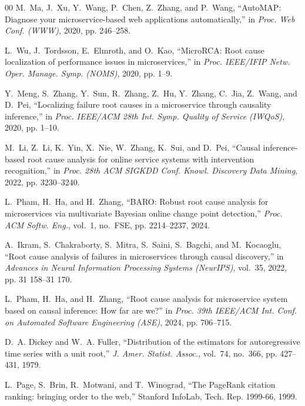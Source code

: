 \documentclass[conference]{IEEEtran}
\begin{document}
\begin{thebibliography}{00}
M.~Ma, J.~Xu, Y.~Wang, P.~Chen, Z.~Zhang, and P.~Wang, ``AutoMAP: Diagnose
your microservice-based web applications automatically,'' in \emph{Proc. Web
Conf. (WWW)}, 2020, pp. 246--258.

L.~Wu, J.~Tordsson, E.~Elmroth, and O.~Kao, ``MicroRCA: Root cause
localization of performance issues in microservices,'' in \emph{Proc.
IEEE/IFIP Netw. Oper. Manage. Symp. (NOMS)}, 2020, pp. 1--9.

Y.~Meng, S.~Zhang, Y.~Sun, R.~Zhang, Z.~Hu, Y.~Zhang, C.~Jia, Z.~Wang, and
D.~Pei, ``Localizing failure root causes in a microservice through causality
inference,'' in \emph{Proc. IEEE/ACM 28th Int. Symp. Quality of Service
(IWQoS)}, 2020, pp. 1--10.

M.~Li, Z.~Li, K.~Yin, X.~Nie, W.~Zhang, K.~Sui, and D.~Pei, ``Causal
inference-based root cause analysis for online service systems with
intervention recognition,'' in \emph{Proc. 28th ACM SIGKDD Conf. Knowl.
Discovery Data Mining}, 2022, pp. 3230--3240.

L.~Pham, H.~Ha, and H.~Zhang, ``BARO: Robust root cause analysis for
microservices via multivariate Bayesian online change point detection,''
\emph{Proc. ACM Softw. Eng.}, vol.~1, no.~FSE, pp. 2214--2237, 2024.

A.~Ikram, S.~Chakraborty, S.~Mitra, S.~Saini, S.~Bagchi, and M.~Kocaoglu,
``Root cause analysis of failures in microservices through causal
discovery,'' in \emph{Advances in Neural Information Processing Systems
(NeurIPS)}, vol.~35, 2022, pp. 31 158--31 170.

L.~Pham, H.~Ha, and H.~Zhang, ``Root cause analysis for microservice system
based on causal inference: How far are we?'' in \emph{Proc. 39th IEEE/ACM
Int. Conf. on Automated Software Engineering (ASE)}, 2024, pp. 706--715.

D.~A. Dickey and W.~A. Fuller, ``Distribution of the estimators for
autoregressive time series with a unit root,'' \emph{J. Amer. Statist. Assoc.},
vol.~74, no.~366, pp. 427--431, 1979.

L.~Page, S.~Brin, R.~Motwani, and T.~Winograd, ``The PageRank citation ranking:
bringing order to the web,'' Stanford InfoLab, Tech. Rep. 1999-66, 1999.

\end{thebibliography}
\end{document}
